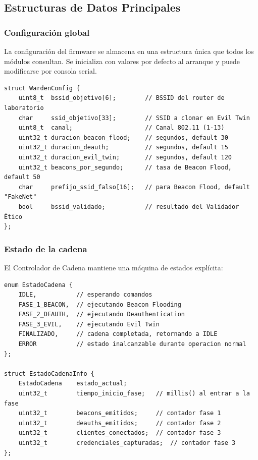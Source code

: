 \documentclass[11pt,a4paper]{article}
\begin{document}
\subsection{Estructuras de Datos Principales}

\subsubsection{Configuración global}
La configuración del firmware se almacena en una estructura única que
todos los módulos consultan. Se inicializa con valores por defecto al
arranque y puede modificarse por consola serial.

\begin{lstlisting}
struct WardenConfig {
    uint8_t  bssid_objetivo[6];        // BSSID del router de laboratorio
    char     ssid_objetivo[33];        // SSID a clonar en Evil Twin
    uint8_t  canal;                    // Canal 802.11 (1-13)
    uint32_t duracion_beacon_flood;    // segundos, default 30
    uint32_t duracion_deauth;          // segundos, default 15
    uint32_t duracion_evil_twin;       // segundos, default 120
    uint32_t beacons_por_segundo;      // tasa de Beacon Flood, default 50
    char     prefijo_ssid_falso[16];   // para Beacon Flood, default "FakeNet"
    bool     bssid_validado;           // resultado del Validador Ético
};
\end{lstlisting}

\subsubsection{Estado de la cadena}
El Controlador de Cadena mantiene una máquina de estados explícita:

\begin{lstlisting}
enum EstadoCadena {
    IDLE,           // esperando comandos
    FASE_1_BEACON,  // ejecutando Beacon Flooding
    FASE_2_DEAUTH,  // ejecutando Deauthentication
    FASE_3_EVIL,    // ejecutando Evil Twin
    FINALIZADO,     // cadena completada, retornando a IDLE
    ERROR           // estado inalcanzable durante operacion normal
};

struct EstadoCadenaInfo {
    EstadoCadena    estado_actual;
    uint32_t        tiempo_inicio_fase;   // millis() al entrar a la fase
    uint32_t        beacons_emitidos;     // contador fase 1
    uint32_t        deauths_emitidos;     // contador fase 2
    uint32_t        clientes_conectados;  // contador fase 3
    uint32_t        credenciales_capturadas;  // contador fase 3
};
\end{lstlisting}
\end{document}
